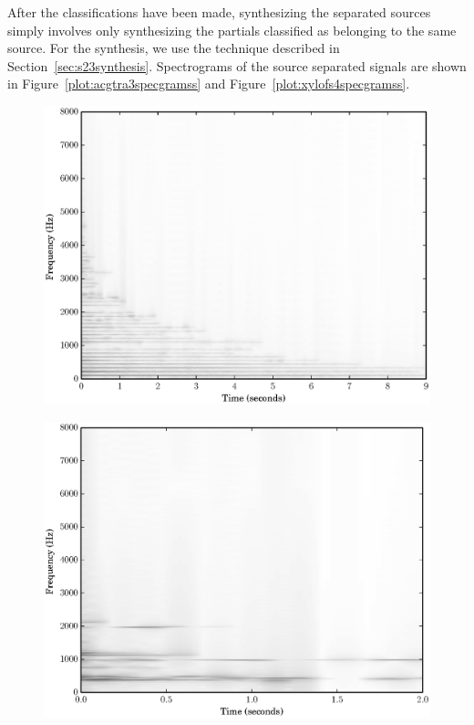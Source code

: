 After the classifications have been made, synthesizing the separated sources
simply involves only synthesizing the partials classified as belonging to the
same source. For the synthesis, we use the technique described in
Section~\ref{sec:s23synthesis}. Spectrograms of the source separated signals
are shown in Figure~\ref{plot:acgtra3specgramss} and
Figure~\ref{plot:xylofs4specgramss}. 

\begin{figure}[!t]
    \centering
    \includegraphics[width=\figwidthscale\textwidth]{plots/ac_gtr_ss_spec.eps}
    \CaptionWithTitle{%
    }{\label{plot:acgtra3specgramss}}
\end{figure}

\begin{figure}[!t]
    \centering
    \includegraphics[width=\figwidthscale\textwidth]{plots/xylo_ss_spec.eps}
    \CaptionWithTitle{%
    }{\label{plot:xylofs4specgramss}}
\end{figure}

